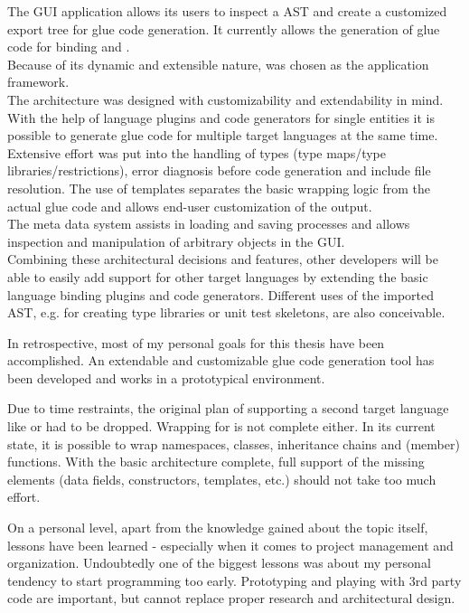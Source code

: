 The  GUI application allows its users to inspect a  AST and create a customized export tree for glue code generation. It currently allows the generation of glue code for binding  and .\\
Because of its dynamic and extensible nature,  was chosen as the application framework.\\
The architecture was designed with customizability and extendability in mind. With the help of language plugins and code generators for single  entities it is possible to generate glue code for multiple target languages at the same time. Extensive effort was put into the handling of types (type maps/type libraries/restrictions), error diagnosis before code generation and include file resolution. The use of templates separates the basic wrapping logic from the actual glue code and allows end-user customization of the output.\\
The meta data system assists in loading and saving processes and allows inspection and manipulation of arbitrary  objects in the GUI.\\
Combining these architectural decisions and features, other developers will be able to easily add support for other target languages by extending the basic language binding plugins and code generators. Different uses of the imported  AST, e.g. for creating type libraries or unit test skeletons, are also conceivable.

In retrospective, most of my personal goals for this thesis have been accomplished. An extendable and customizable glue code generation tool has been developed and works in a prototypical environment.

Due to time restraints, the original plan of supporting a second target language like  or  had to be dropped. Wrapping for  is not complete either. In its current state, it is possible to wrap namespaces, classes, inheritance chains and (member) functions. With the basic architecture complete, full support of the missing elements (data fields, constructors, templates, etc.) should not take too much effort.

On a personal level, apart from the knowledge gained about the topic itself, lessons have been learned - especially when it comes to project management and organization. Undoubtedly one of the biggest lessons was about my personal tendency to start programming too early. Prototyping and playing with 3rd party code are important, but cannot replace proper research and architectural design.

